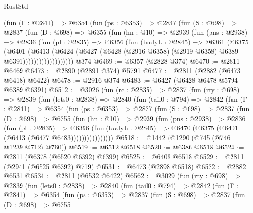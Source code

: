 \begin{lexlean}{RustStd}
\begin{coremodule}
              (fun (Γ : @2841) =>
              @6354
                (fun (ps : @6353) =>
                @2837
                  (fun (S : @698) =>
                  @2837
                    (fun (D : @698) =>
                    @6355
                      (fun (hn : @10) =>
                      @2939
                        (fun (pns : @2938) =>
                        @2836
                          (fun (pl : @2835) =>
                          @6356
                            (fun (bodyL : @2845) =>
                            @6361
                              (@6375
                                (@6401
                                  (@6413
                                    (@6424
                                      (@6427
                                        (@6428
                                          (@2916 @6358)
                                          (@2919 @6358)
                                          @6389
                                          @6391)))))))))))))))))))
    @374
@6469 := @6357 (@2828 @374)
@6470 := @2811 @6469
@6473 := @2890 (@2891 @374) @5791
@6477 := @2811 (@2882 (@6473 @6418) @6422)
@6478 := @2916 @374
@6483 := @6427 (@6428 @6478 @5794 @6389 @6391)
@6512 := @3026
    (fun (rc : @2835) =>
    @2837
      (fun (rty : @698) =>
      @2839
        (fun (lets0 : @2838) =>
        @2840
          (fun (tail0 : @794) =>
          @2842
            (fun (Γ : @2841) =>
            @6354
              (fun (ps : @6353) =>
              @2837
                (fun (S : @698) =>
                @2837
                  (fun (D : @698) =>
                  @6355
                    (fun (hn : @10) =>
                    @2939
                      (fun (pns : @2938) =>
                      @2836
                        (fun (pl : @2835) =>
                        @6356
                          (fun (bodyL : @2845) =>
                          @6470 (@6375 (@6401 (@6413 (@6477 @6483))))))))))))))))
@6518 := @1442 (@1290 (@745 (@746 @1239 @712) @760))
@6519 := @6512 @6518
@6520 := @6386 @6518
@6524 := @2811 (@6378 (@6520 @6392) @6399)
@6525 := @6408 @6518
@6529 := @2811 (@2941 (@6525 @6392) @719)
@6531 := @6473 (@2898 @6518)
@6532 := @2882 @6531
@6534 := @2811 (@6532 @6422)
@6562 := @3029
    (fun (rty : @698) =>
    @2839
      (fun (lets0 : @2838) =>
      @2840
        (fun (tail0 : @794) =>
        @2842
          (fun (Γ : @2841) =>
          @6354
            (fun (ps : @6353) =>
            @2837
              (fun (S : @698) =>
              @2837
                (fun (D : @698) =>
                @6355

\end{coremodule}
\end{lexlean}
